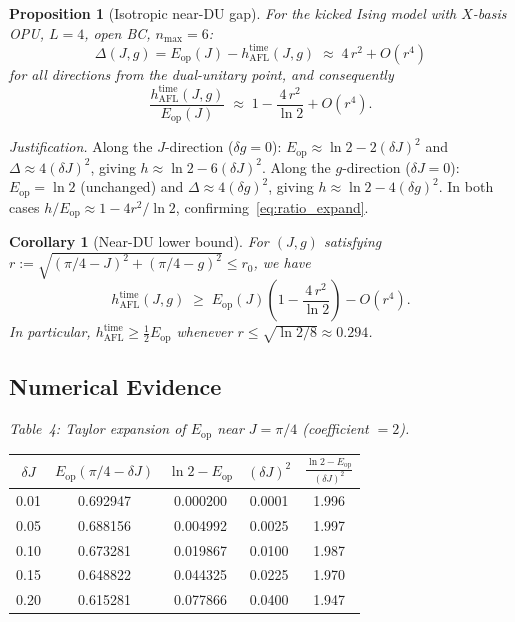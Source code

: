 \documentclass[12pt,a4paper]{article}
\newtheorem{proposition}[theorem]{Proposition}
\newtheorem{corollary}[theorem]{Corollary}
\begin{document}
\begin{proposition}[Isotropic near-DU gap]\label{prop:isotropic_gap}
For the kicked Ising model with $X$-basis OPU, $L=4$, open BC, $n_\mathrm{max}=6$:
\begin{equation}\label{eq:isotropic}
  \Delta(J,g) = E_\mathrm{op}(J) - h_\mathrm{AFL}^\mathrm{time}(J,g)
  \;\approx\; 4\,r^2 + O(r^4)
\end{equation}
for all directions from the dual-unitary point, and consequently
\begin{equation}\label{eq:ratio_expand}
  \frac{h_\mathrm{AFL}^\mathrm{time}(J,g)}{E_\mathrm{op}(J)}
  \;\approx\; 1 - \frac{4\,r^2}{\ln 2} + O(r^4).
\end{equation}
\end{proposition}

\noindent\textit{Justification.}
Along the $J$-direction ($\delta g=0$):
$E_\mathrm{op}\approx\ln 2-2(\delta J)^2$ and $\Delta\approx 4(\delta J)^2$,
giving $h\approx\ln 2-6(\delta J)^2$.
Along the $g$-direction ($\delta J=0$):
$E_\mathrm{op}=\ln 2$ (unchanged) and $\Delta\approx 4(\delta g)^2$,
giving $h\approx\ln 2-4(\delta g)^2$.
In both cases $h/E_\mathrm{op}\approx 1-4r^2/\ln 2$, confirming~\eqref{eq:ratio_expand}.

\begin{corollary}[Near-DU lower bound]\label{cor:near_du_lb}
For $(J,g)$ satisfying $r:=\sqrt{(\pi/4-J)^2+(\pi/4-g)^2}\le r_0$, we have
\begin{equation}\label{eq:near_du_lb}
  h_\mathrm{AFL}^\mathrm{time}(J,g)
  \;\ge\;
  E_\mathrm{op}(J)\!\left(1 - \frac{4\,r^2}{\ln 2}\right) - O(r^4).
\end{equation}
In particular, $h_\mathrm{AFL}^\mathrm{time}\ge\tfrac{1}{2}E_\mathrm{op}$
whenever $r\le\sqrt{\ln 2/8}\approx 0.294$.
\end{corollary}

\subsection{Numerical Evidence}

\noindent\textit{Table~4: Taylor expansion of $E_\mathrm{op}$ near $J=\pi/4$ (coefficient $=2$).}

\begin{center}
\begin{tabular}{@{}ccccc@{}}
\toprule
$\delta J$ & $E_\mathrm{op}(\pi/4-\delta J)$ & $\ln 2 - E_\mathrm{op}$ & $(\delta J)^2$ & $\frac{\ln2-E_\mathrm{op}}{(\delta J)^2}$\\
\midrule
0.01 & 0.692947 & 0.000200 & 0.0001 & 1.996 \\
0.05 & 0.688156 & 0.004992 & 0.0025 & 1.997 \\
0.10 & 0.673281 & 0.019867 & 0.0100 & 1.987 \\
0.15 & 0.648822 & 0.044325 & 0.0225 & 1.970 \\
0.20 & 0.615281 & 0.077866 & 0.0400 & 1.947 \\
\bottomrule
\end{tabular}
\end{center}
\end{document}
